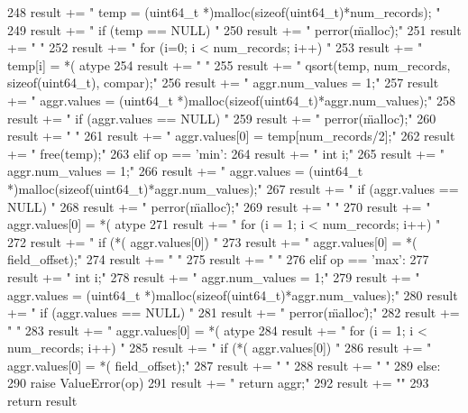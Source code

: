 \begin{DoxyCode}
{248         result += "    temp = (uint64_t *)malloc(sizeof(uint64_t)*num_records);
      \n"
249         result += "    if (temp == NULL) {\n"
250         result += "        perror(\"malloc\");\n"
251         result += "    }\n"
252         result += "    for (i=0; i < num_records; i++) {\n"
253         result += "        temp[i] = *(%
      atype
254         result += "    }\n"
255         result += "    qsort(temp, num_records, sizeof(uint64_t), compar);\n"
256         result += "    aggr.num_values = 1;\n"
257         result += "    aggr.values = (uint64_t
       *)malloc(sizeof(uint64_t)*aggr.num_values);\n"
258         result += "    if (aggr.values == NULL) {\n"
259         result += "        perror(\"malloc\");\n"
260         result += "    }\n"
261         result += "    aggr.values[0] = temp[num_records/2];"
262         result += "    free(temp);\n"
263     elif op == 'min':
264         result += "    int i;\n"
265         result += "    aggr.num_values = 1;\n"
266         result += "    aggr.values = (uint64_t
       *)malloc(sizeof(uint64_t)*aggr.num_values);\n"
267         result += "    if (aggr.values == NULL) {\n"
268         result += "        perror(\"malloc\");\n"
269         result += "    }\n"
270         result += "    aggr.values[0] = *(%
      atype
271         result += "    for (i = 1; i < num_records; i++) {\n"
272         result += "        if (*(%
       aggr.values[0]) {\n"%
273         result += "            aggr.values[0] = *(%
       field_offset);\n"%
274         result += "        }\n"
275         result += "    }\n"
276     elif op == 'max':
277         result += "    int i;\n"
278         result += "    aggr.num_values = 1;\n"
279         result += "    aggr.values = (uint64_t
       *)malloc(sizeof(uint64_t)*aggr.num_values);\n"
280         result += "    if (aggr.values == NULL) {\n"
281         result += "        perror(\"malloc\");\n"
282         result += "    }\n"
283         result += "    aggr.values[0] = *(%
      atype
284         result += "    for (i = 1; i < num_records; i++) {\n"
285         result += "        if (*(%
       aggr.values[0]) {\n"%
286         result += "            aggr.values[0] = *(%
       field_offset);\n"%
287         result += "        }\n"
288         result += "    }\n"
289     else:
290         raise ValueError(op)
291     result += "    return aggr;\n"
292     result += "}\n\n"
293     return result

\end{DoxyCode}
